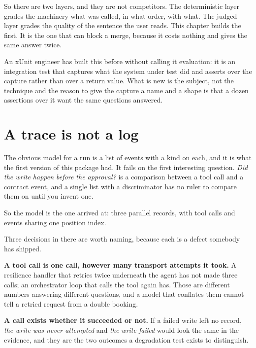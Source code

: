\noindent
So there are two layers, and they are not competitors. The deterministic
layer grades the machinery \dash{} what was called, in what order, with
what. The judged layer grades the quality of the sentence the user reads.
This chapter builds the first. It is the one that can block a merge,
because it costs nothing and gives the same answer twice.

\begin{csbox}
An xUnit engineer has built this before without calling it evaluation: it
is an integration test that captures what the system under test did and
asserts over the capture rather than over a return value. What is new is
the subject, not the technique \dash{} and the reason to give the capture a
name and a shape is that a dozen assertions over it want the same
questions answered.
\end{csbox}

\section{A trace is not a log}
\label{sec:ch14-trace}

The obvious model for a run is a list of events with a kind on each, and it
is what the first version of this package had. It fails on the first
interesting question. \emph{Did the write happen before the approval?} is a
comparison between a tool call and a contract event, and a single list with
a discriminator has no ruler to compare them on until you invent one.

So the model is the one  arrived at: three parallel
records, with tool calls and events sharing one position index.


\noindent
Three decisions in there are worth naming, because each is a defect
somebody has shipped.

\textbf{A tool call is one call, however many transport attempts it took.}
A resilience handler that retries twice underneath the agent has not made
three calls; an orchestrator loop that calls the tool again has. Those are
different numbers answering different questions, and a model that conflates
them cannot tell a retried request from a double booking.

\textbf{A call exists whether it succeeded or not.} If a failed write left
no record, \emph{the write was never attempted} and \emph{the write failed}
would look the same in the evidence, and they are the two outcomes a
degradation test exists to distinguish.

